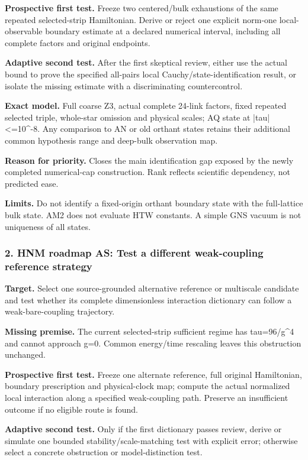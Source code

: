 \textbf{Prospective first test.} Freeze two centered/bulk exhaustions of the same repeated selected-strip Hamiltonian. Derive or reject one explicit norm-one local-observable boundary estimate at a declared numerical interval, including all complete factors and original endpoints.

\textbf{Adaptive second test.} After the first skeptical review, either use the actual bound to prove the specified all-pairs local Cauchy/state-identification result, or isolate the missing estimate with a discriminating countercontrol.

\textbf{Exact model.} Full coarse Z3, actual complete 24-link factors, fixed repeated selected triple, whole-star omission and physical scales; AQ state at |tau|<=10\textasciicircum{}-8. Any comparison to AN or old orthant states retains their additional common hypothesis range and deep-bulk observation map.

\textbf{Reason for priority.} Closes the main identification gap exposed by the newly completed numerical-cap construction. Rank reflects scientific dependency, not predicted ease.

\textbf{Limits.} Do not identify a fixed-origin orthant boundary state with the full-lattice bulk state. AM2 does not evaluate HTW constants. A simple GNS vacuum is not uniqueness of all states.

\subsubsection{2. HNM roadmap AS: Test a different weak-coupling reference strategy}
\textbf{Target.} Select one source-grounded alternative reference or multiscale candidate and test whether its complete dimensionless interaction dictionary can follow a weak-bare-coupling trajectory.

\textbf{Missing premise.} The current selected-strip sufficient regime has tau=96/g\textasciicircum{}4 and cannot approach g=0. Common energy/time rescaling leaves this obstruction unchanged.

\textbf{Prospective first test.} Freeze one alternate reference, full original Hamiltonian, boundary prescription and physical-clock map; compute the actual normalized local interaction along a specified weak-coupling path. Preserve an insufficient outcome if no eligible route is found.

\textbf{Adaptive second test.} Only if the first dictionary passes review, derive or simulate one bounded stability/scale-matching test with explicit error; otherwise select a concrete obstruction or model-distinction test.

